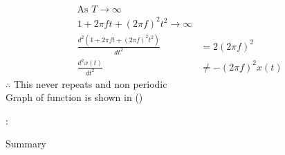 \documentclass[journal,12pt,onecolumn]{IEEEtran}
\theoremstyle{remark}
\begin{document}
\begin{enumerate}
 \begin{align}
  \text{As } T\to\infty\\
  1+2\pi f t+(2\pi f)^2t^2  \to \infty\\
   \frac{d^2(1+2\pi f t+(2\pi f)^2t^2)}{dt^2}&=2(2\pi f)^2\\
   \frac{d^2 x(t)}{dt^2} &\neq - (2\pi f)^2 x(t)
 \end{align}
  $\therefore$ This never repeats and non periodic\\ 
 Graph of function is shown in ()
 \begin{flushleft}
  \begin{table}[h]
   \def\arraystretch{1.5}:
   \caption{Summary}
   \label{tab:table.11.14-4}
   
  \end{table}
 \end{flushleft}
 
\end{enumerate}
 \renewcommand{\thefigure}{\theenumi}
 \renewcommand{\thetable}{\theenumi}
 
\end{document}
